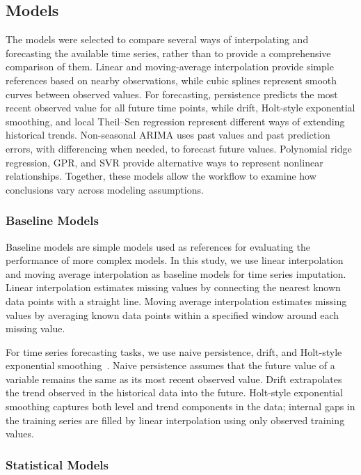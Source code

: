 \subsection{Models}
\label{sec:models}

The models were selected to compare several ways of interpolating and forecasting the available time series, rather than to provide a comprehensive comparison of them.
Linear and moving-average interpolation provide simple references based on nearby observations, while cubic splines represent smooth curves between observed values.
For forecasting, persistence predicts the most recent observed value for all future time points, while drift, Holt-style exponential smoothing, and local Theil--Sen regression represent different ways of extending historical trends.
Non-seasonal ARIMA uses past values and past prediction errors, with differencing when needed, to forecast future values.
Polynomial ridge regression, GPR, and SVR provide alternative ways to represent nonlinear relationships.
Together, these models allow the workflow to examine how conclusions vary across modeling assumptions.

\subsubsection{Baseline Models}

Baseline models are simple models used as references for evaluating the performance of more complex models.
In this study, we use linear interpolation and moving average interpolation as baseline models for time series imputation.
Linear interpolation estimates missing values by connecting the nearest known data points with a straight line.
Moving average interpolation estimates missing values by averaging known data points within a specified window around each missing value.

For time series forecasting tasks, we use naive persistence, drift, and Holt-style exponential smoothing~\cite{holt2004forecasting}.
Naive persistence assumes that the future value of a variable remains the same as its most recent observed value.
Drift extrapolates the trend observed in the historical data into the future.
Holt-style exponential smoothing captures both level and trend components in the data; internal gaps in the training series are filled by linear interpolation using only observed training values.

\subsubsection{Statistical Models}

